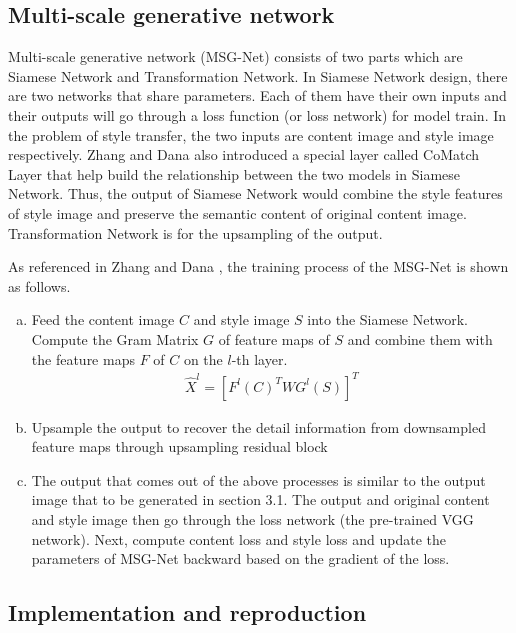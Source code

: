 \documentclass[10pt,twocolumn,letterpaper]{article}
\begin{document}
\subsection{Multi-scale generative network \cite{Authors04}}
Multi-scale generative network (MSG-Net) consists of two parts which are 
Siamese Network and Transformation Network. In Siamese Network \cite{Authors07} design, there are two networks that share parameters. Each of them have their own inputs and their outputs will go through a loss function (or loss network) for model train. In the problem of style transfer, the two inputs are content image and style image respectively. Zhang and Dana \cite{Authors04} also introduced a special layer called CoMatch Layer that help build the relationship between the two models in Siamese Network. Thus, the output of Siamese Network would combine the style features of style image and preserve the semantic content of original content image. Transformation Network is for the upsampling of the output.


\noindent As referenced in Zhang and Dana \cite{Authors04}, the training process of the MSG-Net is shown as follows.
\begin{enumerate}[a.]
    \item Feed the content image $C$ and style image $S$ into the Siamese Network. Compute the Gram Matrix $G$ of feature maps of $S$ and combine them with the feature maps $F$ of $C$ on the $l$-th layer.
    \begin{align}
        \hat X^l = [F^l(C)^T W G^l(S)]^T
    \end{align}
    \item Upsample the output to recover the detail information from downsampled feature maps through upsampling residual block \cite{Authors08}
    \item The output that comes out of the above processes is similar to the output image that to be generated in section 3.1. The output and original content and style image then go through the loss network (the pre-trained VGG network). Next, compute content loss and style loss and update the parameters of MSG-Net backward based on the gradient of the loss.
\end{enumerate}


\subsection{Implementation and reproduction}
\end{document}

